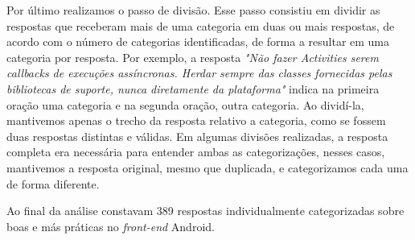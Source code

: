 Por \'ultimo realizamos o passo de divis\~ao. Esse passo consistiu em dividir as respostas que receberam mais de uma categoria em duas ou mais respostas, de acordo com o n\'umero de categorias identificadas, de forma a resultar em uma categoria por resposta. Por exemplo, a resposta \textit{"N\~ao fazer Activities serem callbacks de execu\c{c}\~oes ass\'incronas. Herdar sempre das classes fornecidas pelas bibliotecas de suporte, nunca diretamente da plataforma"} indica na primeira ora\c{c}\~ao uma categoria e na segunda ora\c{c}\~ao, outra categoria. Ao divid\'i-la, mantivemos apenas o trecho da resposta relativo a categoria, como se fossem duas respostas distintas e v\'alidas. Em algumas divis\~oes realizadas, a resposta completa era necess\'aria para entender ambas as categoriza\c{c}\~oes, nesses casos, mantivemos a resposta original, mesmo que duplicada, e categorizamos cada uma de forma diferente. 

Ao final da an\'alise constavam 389 respostas individualmente categorizadas sobre boas e m\'as pr\'aticas no \textit{front-end} Android.